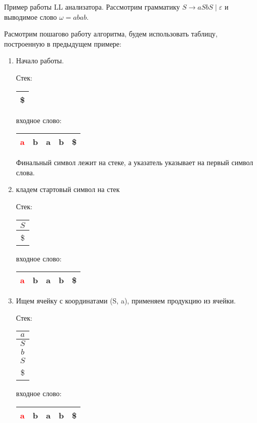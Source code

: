 \begin{example}Пример работы LL анализатора.
Рассмотрим грамматику $S \to aSbS \mid \varepsilon$ и выводимое слово $\omega = abab$.

Расмотрим пошагово работу алгоритма, будем использовать таблицу, построенную в предыдущем примере:

\begin{enumerate}
  \item Начало работы.
  
  Стек: \,
    \begin{tabular}[c]{ |c| } 
        \\ \hline
        \$ \\ \hline
    \end{tabular}  
    \qquad  \qquad \qquad  \qquad входное слово: \,
    \begin{tabular}[c]{ |c|c|c|c|c| } 
        \hline
        \textcolor{red}{a} & b & a & b & \$ \\ \hline
    \end{tabular}
    
Финальный символ лежит на стеке, а указатель указывает на первый символ слова.

  \item кладем стартовый символ на стек

    Стек: \,
    \begin{tabular}[c]{ |c| } 
        \\ \hline
        $S$ \\ \hline
        \$ \\ \hline
    \end{tabular}  
    \qquad  \qquad \qquad  \qquad входное слово: \,
    \begin{tabular}[c]{ |c|c|c|c|c| } 
        \hline
        \textcolor{red}{a} & b & a & b & \$ \\ \hline
    \end{tabular}
    
  \item Ищем ячейку с координатами (S, a), применяем продукцию из ячейки.

    Стек: \,
    \begin{tabular}[c]{ |c| } 
        \\ \hline
        $a$ \\ \hline
        $S$ \\ \hline
        $b$ \\ \hline
        $S$ \\ \hline
        \$ \\ \hline
    \end{tabular}  
    \qquad  \qquad \qquad  \qquad входное слово: \,
    \begin{tabular}[c]{ |c|c|c|c|c| } 
        \hline
        \textcolor{red}{a} & b & a & b & \$ \\ \hline
    \end{tabular}


\end{enumerate}
\end{example}

